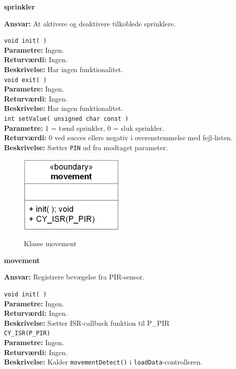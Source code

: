 {\centering
\textbf{sprinkler}\par
}
\textbf{Ansvar:} At aktivere og deaktivere tilkoblede sprinklere. \

\verb+void init( )+ \\
\textbf{Parametre:} Ingen. \\
\textbf{Returværdi:} Ingen. \\
\textbf{Beskrivelse:} Har ingen funktionalitet. \\

\verb+void exit( )+ \\
\textbf{Parametre:} Ingen. \\
\textbf{Returværdi:} Ingen. \\
\textbf{Beskrivelse:} Har ingen funktionalitet. \\

\verb+int setValue( unsigned char const )+ \\
\textbf{Parametre:} 1 = tænd sprinkler, 0 = sluk sprinkler. \\
\textbf{Returværdi:} 0 ved succes ellers negativ i overenstemmelse med fejl-listen. \\
\textbf{Beskrivelse:} Sætter \verb+PIN+ ud fra modtaget parameter.\\

\begin{figure}[htbp] \centering
{\includegraphics[scale=1.3]{filer/design/Klassediagrammer/sw_psoc_movement}}
\caption{Klasse movement}
\label{fig:sw_psoc_class_movement}
\end{figure} 

{\centering
\textbf{movement}\par
}
\textbf{Ansvar:} Registrere bevægelse fra PIR-sensor. \

\verb+void init( )+ \\
\textbf{Parametre:} Ingen. \\
\textbf{Returværdi:} Ingen. \\
\textbf{Beskrivelse:} Sætter ISR-callback funktion til P\_PIR \\

\verb+CY_ISR(P_PIR)+ \\
\textbf{Parametre:} Ingen. \\
\textbf{Returværdi:} Ingen. \\
\textbf{Beskrivelse:} Kalder \verb+movementDetect()+ i \verb+loadData+-controlleren.\\